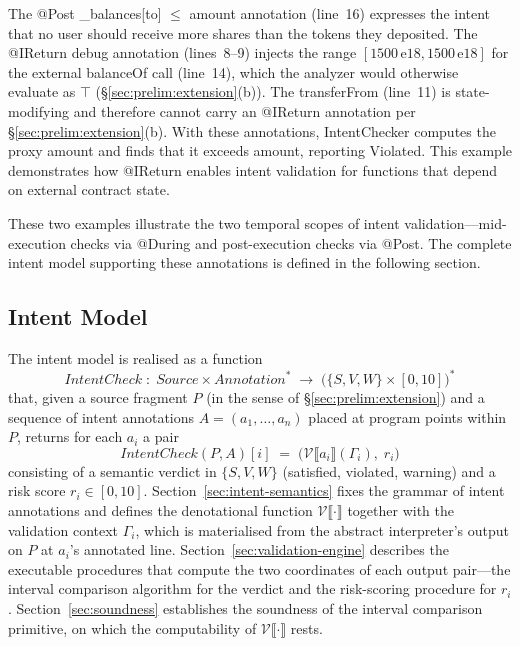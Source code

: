 \documentclass[pdflatex,sn-basic]{sn-jnl}%
\theoremstyle{thmstyleone}%
\theoremstyle{thmstyletwo}%
\theoremstyle{thmstylethree}%
\begin{document}
The @Post \_balances[to] $\leq$ amount annotation (line~16) expresses the intent that no user should receive more shares than the tokens they deposited.
The @IReturn debug annotation (lines~8--9) injects the range $[1500\,\text{e}18, 1500\,\text{e}18]$ for the external balanceOf call (line~14), which the analyzer would otherwise evaluate as $\top$ (§\ref{sec:prelim:extension}(b)).
The transferFrom (line~11) is state-modifying and therefore cannot carry an @IReturn annotation per §\ref{sec:prelim:extension}(b).
With these annotations, IntentChecker computes the proxy amount and finds that it exceeds amount, reporting Violated.
This example demonstrates how @IReturn enables intent validation for functions that depend on external contract state.

\smallskip
These two examples illustrate the two temporal scopes of intent validation---mid-execution checks via @During and post-execution checks via @Post.
The complete intent model supporting these annotations is defined in the following section.

\subsection{Intent Model}\label{sec:intent-model}

The intent model is realised as a function
\[
\mathit{IntentCheck} \;:\; \mathit{Source} \times \mathit{Annotation}^* \;\to\; \bigl(\{S, V, W\} \times [0, 10]\bigr)^*
\]
that, given a source fragment $P$ (in the sense of §\ref{sec:prelim:extension}) and a sequence of intent annotations $A = (a_1, \ldots, a_n)$ placed at program points within $P$, returns for each $a_i$ a pair
\[
\mathit{IntentCheck}(P, A)[i] \;=\; \bigl(\mathcal{V}\llbracket a_i \rrbracket(\Gamma_i),\; r_i\bigr)
\]
consisting of a semantic verdict in $\{S, V, W\}$ (satisfied, violated, warning) and a risk score $r_i \in [0, 10]$.
Section~\ref{sec:intent-semantics} fixes the grammar of intent annotations and defines the denotational function $\mathcal{V}\llbracket\cdot\rrbracket$ together with the validation context $\Gamma_i$, which is materialised from the abstract interpreter's output on $P$ at $a_i$'s annotated line.
Section~\ref{sec:validation-engine} describes the executable procedures that compute the two coordinates of each output pair---the interval comparison algorithm for the verdict and the risk-scoring procedure for $r_i$.
Section~\ref{sec:soundness} establishes the soundness of the interval comparison primitive, on which the computability of $\mathcal{V}\llbracket\cdot\rrbracket$ rests.
\end{document}
